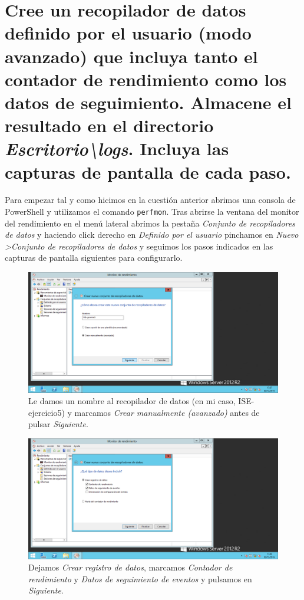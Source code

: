 \section{Cree un recopilador de datos definido por el usuario (modo avanzado) que incluya tanto el contador de rendimiento como los datos de seguimiento. Almacene el resultado en el directorio \textit{Escritorio\textbackslash logs}. Incluya las capturas de pantalla de cada paso.}
Para empezar tal y como hicimos en la cuestión anterior abrimos una consola de PowerShell y utilizamos el comando \verb|perfmon|. Tras abrirse la ventana del monitor del rendimiento en el menú lateral abrimos la pestaña \textit{Conjunto de recopiladores de datos} y haciendo click derecho en \textit{Definido por el usuario} pinchamos en \textit{Nuevo \textgreater Conjunto de recopiladores de datos} y seguimos los pasos indicados en las capturas de pantalla siguientes para configurarlo. \cite{c5}
\begin{figure}[H]
	\centering
	\includegraphics[scale=0.4]{recopilador-1.png}
	\caption{Le damos un nombre al recopilador de datos (en mi caso, ISE-ejercicio5) y marcamos \textit{Crear manualmente (avanzado)} antes de pulsar \textit{Siguiente}.}
\end{figure}

\begin{figure}[H]
	\centering
	\includegraphics[scale=0.4]{recopilador-2.png}
	\caption{Dejamos \textit{Crear registro de datos}, marcamos \textit{Contador de rendimiento} y \textit{Datos de seguimiento de eventos} y pulsamos en \textit{Siguiente}.}
\end{figure}

